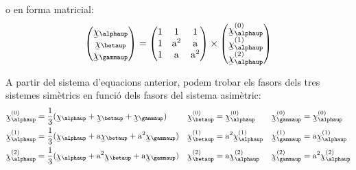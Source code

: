 o en forma matricial:
\begin{equation}
   \begin{pmatrix}
     \cmplx{\chi}_\alphaup \\
     \cmplx{\chi}_\betaup \\
     \cmplx{\chi}_\gammaup
   \end{pmatrix} =
   \begin{pmatrix}
     1 & 1 & 1 \\
     1 & \au^2 & \au\\
     1 & \au & \au^2
   \end{pmatrix} \times
   \begin{pmatrix}
     \cmplx{\chi}_\alphaup\ap{(0)} \\
     \cmplx{\chi}_\alphaup\ap{(1)} \\
     \cmplx{\chi}_\alphaup\ap{(2)}
   \end{pmatrix}
\end{equation}

A partir del sistema d'equacions anterior, podem trobar els fasors
dels tres sistemes sim\`{e}trics en funci\'{o} dels fasors del sistema
asim\`{e}tric:
\begin{subequations}
\begin{align}
   \cmplx{\chi}_\alphaup\ap{(0)} &= \frac{1}{3} (\cmplx{\chi}_\alphaup + \cmplx{\chi}_\betaup +
   \cmplx{\chi}_\gammaup) & \cmplx{\chi}_\betaup\ap{(0)} &= \cmplx{\chi}_\alphaup\ap{(0)} &
   \cmplx{\chi}_\gammaup\ap{(0)} &= \cmplx{\chi}_\alphaup\ap{(0)}
   \label{eq:c_sim_c2}\\
   \cmplx{\chi}_\alphaup\ap{(1)} &= \frac{1}{3} (\cmplx{\chi}_\alphaup + \au \cmplx{\chi}_\betaup +
   \au^2 \cmplx{\chi}_\gammaup) & \cmplx{\chi}_\betaup\ap{(1)} &= \au^2 \cmplx{\chi}_\alphaup\ap{(1)} &
   \cmplx{\chi}_\gammaup\ap{(1)} &= \au \cmplx{\chi}_\alphaup\ap{(1)} \label{eq:c_sim_a2} \\
   \cmplx{\chi}_\alphaup\ap{(2)} &= \frac{1}{3} (\cmplx{\chi}_\alphaup + \au^2 \cmplx{\chi}_\betaup +
   \au \cmplx{\chi}_\gammaup) & \cmplx{\chi}_\betaup\ap{(2)} &= \au \cmplx{\chi}_\alphaup\ap{(2)} &
   \cmplx{\chi}_\gammaup\ap{(2)} &= \au^2 \cmplx{\chi}_\alphaup\ap{(2)} \label{eq:c_sim_b2}
\end{align}
\end{subequations}

